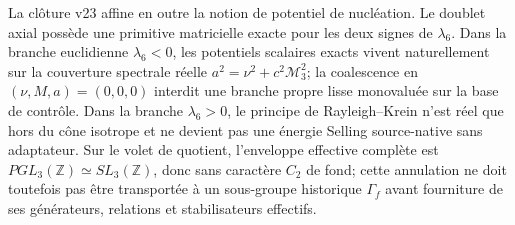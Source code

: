 \documentclass[11pt,a4paper]{article}
\begin{document}
La clôture v23 affine en outre la notion de potentiel de nucléation. Le doublet axial possède une primitive matricielle exacte pour les deux signes de $\lambda_6$. Dans la branche euclidienne $\lambda_6<0$, les potentiels scalaires exacts vivent naturellement sur la couverture spectrale réelle $a^2=\nu^2+c^2\mathcal M_3^2$; la coalescence en $(\nu,M,a)=(0,0,0)$ interdit une branche propre lisse monovaluée sur la base de contrôle. Dans la branche $\lambda_6>0$, le principe de Rayleigh--Krein n'est réel que hors du cône isotrope et ne devient pas une énergie Selling source-native sans adaptateur. Sur le volet de quotient, l'enveloppe effective complète est $PGL_3(\mathbb Z)\simeq SL_3(\mathbb Z)$, donc sans caractère $C_2$ de fond; cette annulation ne doit toutefois pas être transportée à un sous-groupe historique $\Gamma_f$ avant fourniture de ses générateurs, relations et stabilisateurs effectifs.
\end{document}
